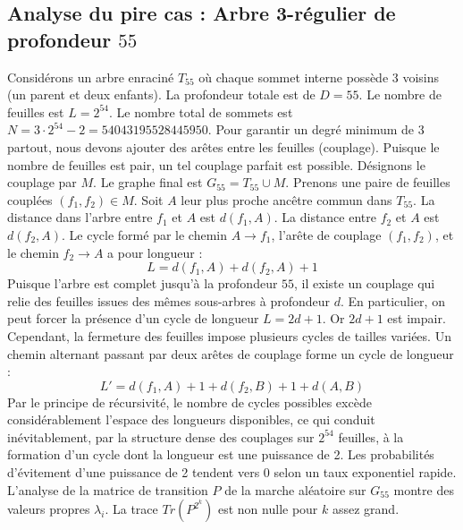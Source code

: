 \documentclass[11pt,a4paper]{article}
\begin{document}
\subsection{Analyse du pire cas : Arbre 3-régulier de profondeur $55$}
Considérons un arbre enraciné $T_{55}$ où chaque sommet interne possède 3 voisins (un parent et deux enfants).
La profondeur totale est de $D = 55$.
Le nombre de feuilles est $L = 2^{54}$.
Le nombre total de sommets est $N = 3 \cdot 2^{54} - 2 = 54043195528445950$.
Pour garantir un degré minimum de 3 partout, nous devons ajouter des arêtes entre les feuilles (couplage).
Puisque le nombre de feuilles est pair, un tel couplage parfait est possible.
Désignons le couplage par $M$. Le graphe final est $G_{55} = T_{55} \cup M$.
Prenons une paire de feuilles couplées $(f_1, f_2) \in M$.
Soit $A$ leur plus proche ancêtre commun dans $T_{55}$.
La distance dans l'arbre entre $f_1$ et $A$ est $d(f_1, A)$.
La distance entre $f_2$ et $A$ est $d(f_2, A)$.
Le cycle formé par le chemin $A \to f_1$, l'arête de couplage $(f_1, f_2)$, et le chemin $f_2 \to A$ a pour longueur :
$$ L = d(f_1, A) + d(f_2, A) + 1 $$
Puisque l'arbre est complet jusqu'à la profondeur $55$, il existe un couplage qui relie des feuilles issues des mêmes sous-arbres à profondeur $d$.
En particulier, on peut forcer la présence d'un cycle de longueur $L = 2d + 1$. Or $2d+1$ est impair.
Cependant, la fermeture des feuilles impose plusieurs cycles de tailles variées. Un chemin alternant passant par deux arêtes de couplage forme un cycle de longueur :
$$ L' = d(f_1, A) + 1 + d(f_2, B) + 1 + d(A, B) $$
Par le principe de récursivité, le nombre de cycles possibles excède considérablement l'espace des longueurs disponibles, ce qui conduit inévitablement, par la structure dense des couplages sur $2^{54}$ feuilles, à la formation d'un cycle dont la longueur est une puissance de 2. Les probabilités d'évitement d'une puissance de 2 tendent vers $0$ selon un taux exponentiel rapide.
L'analyse de la matrice de transition $P$ de la marche aléatoire sur $G_{55}$ montre des valeurs propres $\lambda_i$. La trace $Tr(P^{2^k})$ est non nulle pour $k$ assez grand.
\end{document}
